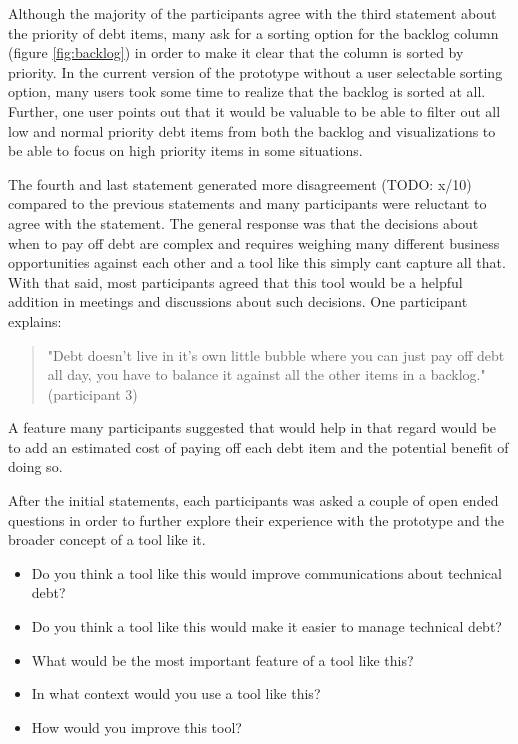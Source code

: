 Although the majority of the participants agree with the third statement about the priority of debt items, many ask for a sorting option for the backlog column (figure \ref{fig:backlog}) in order to make it clear that the column is sorted by priority.
In the current version of the prototype without a user selectable sorting option, many users took some time to realize that the backlog is sorted at all.
Further, one user points out that it would be valuable to be able to filter out all low and normal priority debt items from both the backlog and visualizations to be able to focus on high priority items in some situations.

The fourth and last statement generated more disagreement (TODO: x/10) compared to the previous statements and many participants were reluctant to agree with the statement.
The general response was that the decisions about when to pay off debt are complex and requires weighing many different business opportunities against each other and a tool like this simply cant capture all that.
With that said, most participants agreed that this tool would be a helpful addition in meetings and discussions about such decisions.
One participant explains:
\begin{quote}
  "Debt doesn't live in it's own little bubble where you can just pay off debt all day, you have to balance it against all the other items in a backlog." (participant 3)
\end{quote}
A feature many participants suggested that would help in that regard would be to add an estimated cost of paying off each debt item and the potential benefit of doing so.

After the initial statements, each participants was asked a couple of open ended questions in order to further explore their experience with the prototype and the broader concept of a tool like it.

\smallskip
\begin{itemize}
  \item Do you think a tool like this would improve communications about technical debt?
  \item Do you think a tool like this would make it easier to manage technical debt?
  \item What would be the most important feature of a tool like this?
  \item In what context would you use a tool like this?
  \item How would you improve this tool?
\end{itemize}
\smallskip

